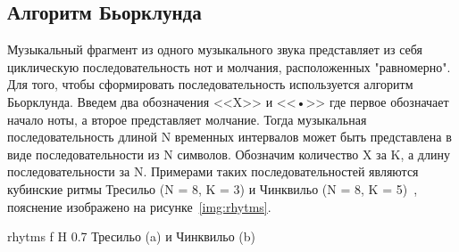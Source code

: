 \subsection{Алгоритм Бьорклунда}
Музыкальный фрагмент из одного музыкального звука представляет из себя циклическую последовательность нот и молчания, расположенных "равномерно". Для того, чтобы сформировать последовательность используется алгоритм Бьорклунда. Введем два обозначения <<X>> и <<•>> где первое обозначает начало ноты, а второе представляет молчание. Тогда музыкальная последовательность длиной N временных интервалов может быть представлена в виде последовательности из N символов. Обозначим количество X за K, а длину последовательности за N. Примерами таких последовательностей являются кубинские ритмы Тресильо (N = 8, K = 3) и Чинквильо (N = 8, K = 5)~\cite{bjorklund}, пояснение изображено на рисунке~\ref{img:rhytms}.

{rhytms}
{f}
{H}
{0.7\textwidth}
{Тресильо (a) и Чинквильо (b)}

